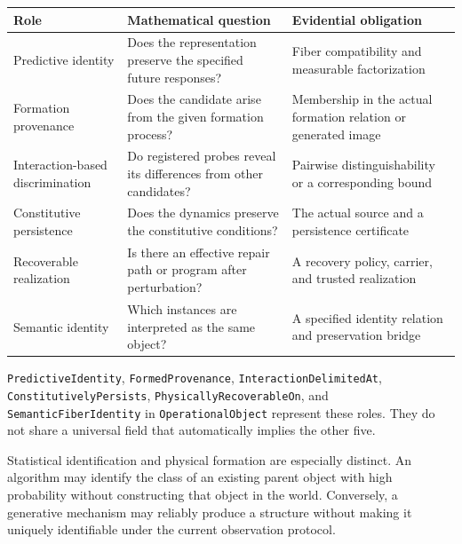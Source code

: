 \documentclass[
  english,
  11pt,
  oneside]{book}
\newcounter{none} %
\begin{document}
{\def\LTcaptype{none} %
\begin{longtable}[]{@{}
  >{\raggedright\arraybackslash}p{}
  >{\raggedright\arraybackslash}p{}
  >{\raggedright\arraybackslash}p{}@{}}
\toprule\noalign{}
\begin{minipage}[b]{\linewidth}\raggedright
Role
\end{minipage} & \begin{minipage}[b]{\linewidth}\raggedright
Mathematical question
\end{minipage} & \begin{minipage}[b]{\linewidth}\raggedright
Evidential obligation
\end{minipage} \\
\midrule\noalign{}
\endhead
\bottomrule\noalign{}
\endlastfoot
Predictive identity & Does the representation preserve the specified future responses? & Fiber compatibility and measurable factorization \\
Formation provenance & Does the candidate arise from the given formation process? & Membership in the actual formation relation or generated image \\
Interaction-based discrimination & Do registered probes reveal its differences from other candidates? & Pairwise distinguishability or a corresponding bound \\
Constitutive persistence & Does the dynamics preserve the constitutive conditions? & The actual source and a persistence certificate \\
Recoverable realization & Is there an effective repair path or program after perturbation? & A recovery policy, carrier, and trusted realization \\
Semantic identity & Which instances are interpreted as the same object? & A specified identity relation and preservation bridge \\
\end{longtable}
}

\nolinkurl{PredictiveIdentity}, \nolinkurl{FormedProvenance}, \nolinkurl{InteractionDelimitedAt}, \nolinkurl{ConstitutivelyPersists}, \nolinkurl{PhysicallyRecoverableOn}, and \nolinkurl{SemanticFiberIdentity} in \nolinkurl{OperationalObject} represent these roles. They do not share a universal field that automatically implies the other five.

Statistical identification and physical formation are especially distinct. An algorithm may identify the class of an existing parent object with high probability without constructing that object in the world. Conversely, a generative mechanism may reliably produce a structure without making it uniquely identifiable under the current observation protocol.
\end{document}
